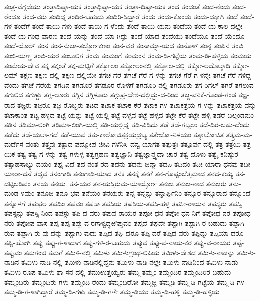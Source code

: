 ತಂತ್ರ-ವೆಗ್ಗಡೆಯು
ತಂತ್ರಾದಿಷ್ಟಾ-ಯಕ
ತಂತ್ರಾಧಿಷ್ಟಾ-ಯಕ
ತಂತ್ರಾ-ಧಿಷ್ಠಾ-ಯಕ
ತಂದ
ತಂದಂತೆ
ತಂದ-ನೆಂದು
ತಂದ-ರೆಂದೂ
ತಂದ-ವರು
ತಂದಿದ್ದ
ತಂದಿರ-ಬಹುದು
ತಂದಿರಿ-ಸಿದ್ದಾರೆ
ತಂದು
ತಂದು-ಕೊಂಡು
ತಂದು-ದಕ್ಕಾಗಿ
ತಂದೆ
ತಂದೆ-ಗಳ
ತಂದೆಗೆ
ತಂದೆ-ತಾಯಿ-ಗಳು
ತಂದೆ-ತಾಯಿ-ಗ-ಳೆಂದು
ತಂದೆ-ತಾಯಿ-ಯನು
ತಂದೆಯ
ತಂದೆ-ಯ-ಕಾಲ-ದಲ್ಲೇ
ತಂದೆ-ಯ-ಗಂಧ-ವಾರಣ
ತಂದೆ-ಯನ್ನು
ತಂದೆ-ಯಾ-ಗಿದ್ದು
ತಂದೆ-ಯಾದ
ತಂದೆಯು
ತಂದೆಯೂ
ತಂದೆ-ಯೆಂದೂ
ತಂದೆ-ಯೊಲ್
ತಂನ
ತಂನ-ನುಜಾ-ತರ್ಬ್ಬೋಕಣಂ
ತಂನ-ವರ
ತಂನಾಮ್ನಾ-ಯದ
ತಂನೊಳ್
ತಂನ್ನ
ತಂಪಿನ
ತಂಬಿ
ತಂಬಿ-ಯಣ್ಣ
ತಂಬಿ-ಯರ
ತಂಬುಲಿಗ
ತಂಮ
ತಂಮಂಗೆ
ತಂಮಂನ
ತಂಮ-ಡಿ-ಗಟ್ಟೆಯ
ತಂಮ-ಡಿ-ಹಳ್ಳಿಯ
ತಂಮಯ
ತಂಮೆಯ-ದೇವ
ತಕ್ಕ
ತಕ್ಕಂತೆ
ತಕ್ಕ-ಮಟ್ಟಿಗೆ
ತಕ್ಕೋಲಂ
ತಕ್ಕೋಲಂನಲ್ಲಿ
ತಕ್ಕೋಲ-ದಲ್ಲಿ
ತಕ್ಕೋ-ಲದೊಲ್ಕಾದಿ
ತಕ್ಕೋ-ಲಮ್
ತಕ್ಷಣ
ತಕ್ಷಣ-ದಲ್ಲಿ
ತಕ್ಷಣ-ದಲ್ಲಿಯೇ
ತಗಚ-ಗೆರೆ
ತಗಚೆ-ಗೆರೆ-ಗ-ಳನ್ನು
ತಗಚೆ-ಗೆರೆ-ಗ-ಳನ್ನೇ
ತಗಚೆ-ಗೆರೆ-ಗಳಿದ್ದ-ವೆಂದು
ತಗಚೆ-ಗೆರೆಯ
ತಗಡಿನ
ತಗಡೂರ
ತಗಡೂರ-ರೊಳಗೆ
ತಗಡೂರಿ-ನಲ್ಲಿ
ತಗಡೂರು
ತಗ-ರಿಗಲ್
ತಗರೆ
ತಗಲುವ
ತಗುಲಿದ
ತಗುಳ್ದು
ತಗ್ಗ-ಲೂರು
ತಗ್ಗಿನ
ತಗ್ಗಿಳೂರು
ತಗ್ಗುಪ್ರ-ದೇಶ-ದಲ್ಲಿದ್ದು-ದ-ರಿಂದ
ತಜ್ಜ-ವನಿಕೆ-ಗೊಂಡ-ಗಂಡ
ತಜ್ಞ-ರಾದ
ತಜ್ಞರು
ತಜ್ಞರೂ
ತಜ್ಞ-ರೊಬ್ಬರು
ತಟದ
ತಟಾಕ
ತಟಾಕ-ಕೆರೆ
ತಟಾಕ-ಗಳ
ತಟಾಕತ್ರಯ-ಗ-ಳನ್ನು
ತಟಾಕತ್ರಯ-ವನ್ನು
ತಟಾಕಾಂತ
ತಟ್ಟ-ಹಳ್ಳದ
ತಟ್ಟೆ-ಯನ್ನು
ತಟ್ಟೆ-ಯಲ್ಲಿ
ತಟ್ಟೆ-ವಳ್ಳವ
ತಟ್ಟೆ-ಹಳ್ಳದ
ತಟ್ಟೇ-ಕೆರೆ
ತಟ್ಟೇ-ಹಳ್ಳಿ
ತಡರೆ-ಬಲ್ಗಂಡನುಂ
ತಡಿನ
ತಡಿಮಾ-ಲಿಂಗಿ
ತಡಿಮಾ-ಲಿಂಗಿ-ಯಲ್ಲಿ
ತಡಿ-ಯಲ್ಲಿದ್ದ
ತಡಿ-ವಿಡಿದು
ತಡೆ
ತಡೆ-ಗಟ್ಟಲು
ತಡೆ-ದಿರ-ಬಹು-ದೆಂದು
ತಡೆದು
ತಡೆ-ಯಲಾ-ಗದೆ
ತಡೆ-ಯುವ
ತತು-ಕಾಲೋಚಿತಕ್ರಯದ್ರಬ್ಯ
ತತೇಜೋ-ನಿಳಯಂ
ತತ್ಕಾಲೋಚಿತ
ತತ್ಕ್ರಮ-ಮ-ಮರ್ದೆಸೆ-ವಂತು
ತತ್ತ್ವವು
ತತ್ಪಾದ-ಪದ್ಮೋಪ-ಜೀವಿ-ಗಳೆನಿಸಿ-ದನ್ವ-ಯಾಗತ
ತತ್ಪುತ್ರಃ
ತತ್ಪೂರ್ವ-ದಲ್ಲಿ
ತತ್ರ
ತತ್ರಯಿ
ತತ್ರ-ಯಿಕ
ತತ್ವ
ತತ್ವ-ಗ-ಳನ್ನು
ತತ್ವ-ಗಳುಳ್ಳ
ತತ್ವಗ್ರಹಣ
ತತ್ವಜ್ಞಾನಿ
ತತ್ವಜ್ಞಾನ್ತ್ಸದಾ-ಚಾರ
ತತ್ವ-ದೊಳು
ತತ್ವೈ-ಕನಿಷ್ಠುರ
ತತ್ಸಾಹಸಾಭ್ಯು-ದಯಂ
ತಥ್ಯ-ವಿದೆ
ತದ-ನಂತ-ರದ
ತದನು
ತದನು-ಜನ್ಮಾ
ತದಪಿ
ತದಿದಂ
ತದೀ-ಯಾರಾ-ಧನವು
ತದೀ-ಯಾರಾ-ಧನೆ
ತದ್ಭವ
ತನಂಗಾಡಿ
ತನಂಗಾಡಿ-ಯಾದ
ತನಕ
ತನಕ್ಕೆ
ತನಗೆ
ತನ-ಗೊಪ್ಪಂಬೆತ್ತಮಾದ
ತನದ-ಕಯ್ಯ
ತನ-ದಟ್ಟಿಬಡಿವಂ
ತನಯ
ತನಯಃ
ತನ-ಯರ
ತನ-ಯಸ್ತಿರುಮ-ಯಾರ್ಯ್ಯೋ
ತನುಜ
ತನುಜ-ನಾದ
ತನುಜರು
ತನು-ಮಂಡ-ಳಮಂ
ತನೂಜ
ತನೂ-ಭವ
ತನೆಯಂ
ತನೆಯರು
ತನ್ನ
ತನ್ನನ್ನು
ತನ್ನಾರ್ಪ್ಪಿನಿಂ
ತನ್ನೂರ
ತನ್ನೂರಾದ
ತನ್ನೊಂದೆ
ತನ್ನೊಳಗೆ
ತಪಃಫಲ
ತಪದಿಂ
ತಪವಂ
ತಪಸಾ
ತಪಸಿಯ
ತಪಸಿಯ-ತಪಸಿ-ಹಳ್ಳಿ
ತಪಸೀ-ರಾಯನ
ತಪಸ್ಯರು
ತಪಸ್ವಿ
ತಪಸ್ಸನ್ನು
ತಪಸ್ಸಿ-ನಿಂದ
ತಪಸ್ಸು
ತಪಿ-ದ-ವರು
ತಪುವ-ರಾಯರ
ತಪೋ-ಧನ
ತಪೋ-ಧನ-ನಿಗೆ
ತಪೋಧ-ನರ
ತಪೋಧ-ನರು
ತಪೋಪ-ವಾಸ
ತಪ್ಪ
ತಪ್ಪ-ತಪ್ಪು-ವ-ರಗಾಳ್ವದ್ಧಱಿಪ್ಪುವಂ
ತಪ್ಪದೆ
ತಪ್ಪದೇ
ತಪ್ಪಾಗಿ
ತಪ್ಪಾಗಿ-ರ-ಬಹುದು
ತಪ್ಪಾಗಿ-ರುವ
ತಪ್ಪಾಗಿ-ರು-ವು-ದನ್ನು
ತಪ್ಪಾಗು-ವುದು
ತಪ್ಪಿದ
ತಪ್ಪಿ-ದರೂ
ತಪ್ಪಿ-ದರೆ
ತಪ್ಪಿದ-ವರು
ತಪ್ಪಿದ್ದು
ತಪ್ಪಿಯಾ-ದರೂ
ತಪ್ಪಿ-ಹೋಗಿ
ತಪ್ಪು
ತಪ್ಪು-ಗ-ಳಾದಾಗ
ತಪ್ಪು-ಗಳಿ-ರ-ಬಹುದು
ತಪ್ಪುವ
ತಪ್ಪು-ವ-ನಾಯ-ಕರ
ತಪ್ಪು-ವ-ರಾಯರ
ತಪ್ಪೆ-ತಪ್ಪುವಂ
ತಮಗಂಜಿ
ತಮಗೆ
ತಮಿಳಿ-ನಲ್ಲಿ
ತಮಿಳು
ತಮಿಳುಗ್ರಂಥ-ಲಿಪಿಯ
ತಮಿಳು-ದೇಶದ
ತಮಿಳು-ನಾಡನ್ನು
ತಮಿಳು-ನಾಡಿನ
ತಮಿಳು-ನಾಡಿ-ನಲ್ಲಿ
ತಮಿಳು-ನಾಡಿನಲ್ಲಿದ್ದನು
ತಮಿಳು-ನಾಡಿ-ನಲ್ಲೇ
ತಮಿಳು-ನಾಡಿನಿಂದ
ತಮಿಳು-ನಾಡು
ತಮಿಳು-ರೂಪ
ತಮಿಳು-ಶಾ-ಸನ-ದಲ್ಲಿ
ತಮುಉತ್ತಯ್ವರು
ತಮ್ಮ
ತಮ್ಮಂ
ತಮ್ಮಂದಿರ
ತಮ್ಮಂದಿರಿರ-ಬಹುದು
ತಮ್ಮಂದಿರು
ತಮ್ಮಂದಿರು-ಗಳು
ತಮ್ಮಂದಿ-ರೆಂದು
ತಮ್ಮಂದಿರೋ
ತಮ್ಮಜ್ಜ
ತಮ್ಮಡಿ
ತಮ್ಮ-ಡಿ-ಗಟ್ಟೆಯ
ತಮ್ಮ-ಡಿ-ಗಳ
ತಮ್ಮ-ಡಿ-ಗ-ಳಾಗಿದ್ದಾರೆ
ತಮ್ಮ-ಡಿ-ಗಳು
ತಮ್ಮ-ಡಿ-ಗಳೇ
ತಮ್ಮ-ಡಿಯು
ತಮ್ಮ-ಡಿ-ಹಳ್ಳಿ
ತಮ್ಮ-ಡಿ-ಹಳ್ಳಿಯ
